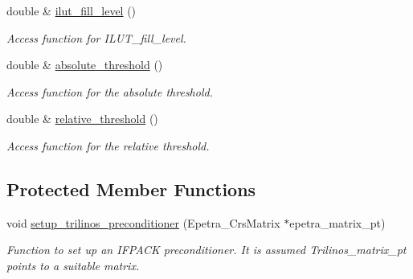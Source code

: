 \begin{DoxyCompactItemize}
double \& \hyperlink{classoomph_1_1TrilinosIFPACKPreconditioner_a0938527b3acb852f417addd7e27e2512}{ilut\+\_\+fill\+\_\+level} ()
\begin{DoxyCompactList}\small\item\em Access function for I\+L\+U\+T\+\_\+fill\+\_\+level. \end{DoxyCompactList}\item 
double \& \hyperlink{classoomph_1_1TrilinosIFPACKPreconditioner_a5e9110a28b1bc51797b009594fb01d0a}{absolute\+\_\+threshold} ()
\begin{DoxyCompactList}\small\item\em Access function for the absolute threshold. \end{DoxyCompactList}\item 
double \& \hyperlink{classoomph_1_1TrilinosIFPACKPreconditioner_af69b257adde04f4145bf8f2326feaf5c}{relative\+\_\+threshold} ()
\begin{DoxyCompactList}\small\item\em Access function for the relative threshold. \end{DoxyCompactList}\end{DoxyCompactItemize}
\subsection*{Protected Member Functions}
\begin{DoxyCompactItemize}
\item 
void \hyperlink{classoomph_1_1TrilinosIFPACKPreconditioner_a947df99c1dd6afa6a3149d045f9452a4}{setup\+\_\+trilinos\+\_\+preconditioner} (Epetra\+\_\+\+Crs\+Matrix $\ast$epetra\+\_\+matrix\+\_\+pt)
\begin{DoxyCompactList}\small\item\em Function to set up an I\+F\+P\+A\+CK preconditioner. It is assumed Trilinos\+\_\+matrix\+\_\+pt points to a suitable matrix. \end{DoxyCompactList}\end{DoxyCompactItemize}
